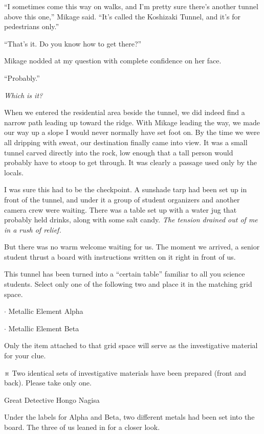 \documentclass[
    a4paper,
    12pt,
    twoside,
    openany,
    UTF8,
    fontset=windows
]{ctexbook}
\begin{document}
``I sometimes come this way on walks, and I'm pretty sure there's another tunnel above this one,'' Mikage said. ``It's called the Koshizaki Tunnel, and it's for pedestrians only.''

``That's it. Do you know how to get there?''

Mikage nodded at my question with complete confidence on her face.

``Probably.''

\textit{Which is it?}

When we entered the residential area beside the tunnel, we did indeed find a narrow path leading up toward the ridge. With Mikage leading the way, we made our way up a slope I would never normally have set foot on. By the time we were all dripping with sweat, our destination finally came into view. It was a small tunnel carved directly into the rock, low enough that a tall person would probably have to stoop to get through. It was clearly a passage used only by the locals.

I was sure this had to be the checkpoint. A sunshade tarp had been set up in front of the tunnel, and under it a group of student organizers and another camera crew were waiting. There was a table set up with a water jug that probably held drinks, along with some salt candy. \textit{The tension drained out of me in a rush of relief.}

But there was no warm welcome waiting for us. The moment we arrived, a senior student thrust a board with instructions written on it right in front of us.

This tunnel has been turned into a ``certain table'' familiar to all you science students. Select only one of the following two and place it in the matching grid space.

$\cdot$ Metallic Element Alpha

$\cdot$ Metallic Element Beta

Only the item attached to that grid space will serve as the investigative material for your clue.

※ Two identical sets of investigative materials have been prepared (front and back). Please take only one.

\begin{flushright}
Great Detective Hongo Nagisa
\end{flushright}

Under the labels for Alpha and Beta, two different metals had been set into the board. The three of us leaned in for a closer look.
\end{document}
